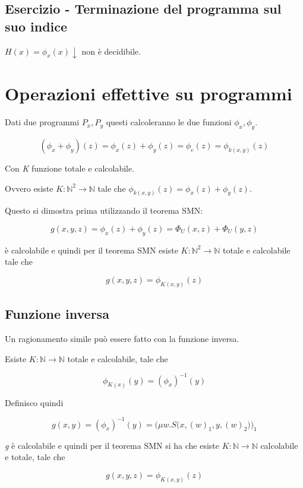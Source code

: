 
\subsection{Esercizio - Terminazione del programma sul suo indice}

$H(x) = \phi_x(x) \downarrow$ non è decidibile.


\section{Operazioni effettive su programmi}

Dati due programmi $ P_x, P_y $ questi calcoleranno le due funzioni $\phi_x, \phi_y$.

$$
(\phi_x + \phi_y)(z) = \phi_x(z) + \phi_y(z) = \phi_e(z) = \phi_{k(x,y)}(z)
$$

Con \textit{K} funzione totale e calcolabile.

Ovvero esiste $ K : \mathbb{N}^2 \rightarrow \mathbb{N} $ tale che $ \phi_{k(x,y)}(z) = \phi_x(z) + \phi_y(z)$.

Questo si dimostra prima utilizzando il teorema SMN:

$$
g(x,y,z) = \phi_x(z) + \phi_y(z) = \Phi_U(x,z) + \Phi_U(y,z)
$$

è calcolabile e quindi per il teorema SMN esiste $ K : \mathbb{N}^2 \rightarrow \mathbb{N} $ totale e calcolabile tale che 

$$
g(x,y,z) = \phi_{K(x,y)}(z)
$$

\subsection{Funzione inversa}

Un ragionamento simile può essere fatto con la funzione inversa.

Esiste $ K : \mathbb{N} \rightarrow \mathbb{N} $ totale e calcolabile, tale che

$$
\phi_{K(x)}(y) = (\phi_x)^{-1}(y)
$$

Definisco quindi 

$$
g(x,y) =  (\phi_x)^{-1}(y) = \Big(\mu w. S\big(x,(w)_1, y, (w)_2\big)\Big)_1
$$

\textit{g} è calcolabile e quindi per il teorema SMN si ha che esiste $ K : \mathbb{N} \rightarrow \mathbb{N} $  calcolabile e totale, tale che

$$
g(x,y,z) = \phi_{K(x,y)}(z)
$$



